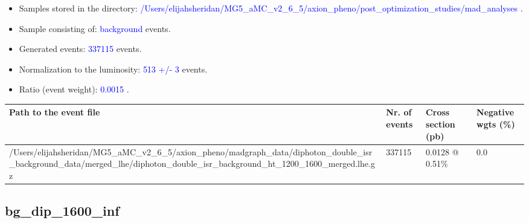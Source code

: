 \documentclass[a4paper, 10pt]{article}
\begin{document}
\begin{itemize}
  \item Samples stored in the directory: \textcolor{blue}{/\-Users/\-elijahsheridan/\-MG5\_aMC\_v2\_6\_5/\-axion\_pheno/\-post\_optimization\_studies/\-mad\_analyses} .
   \item Sample consisting of: \textcolor{blue}{background}  events.
   \item Generated events: \textcolor{blue}{337115 }  events.
   \item Normalization to the luminosity: \textcolor{blue}{513}\textcolor{blue}{ +/\-- }\textcolor{blue}{3 }  events.
   \item Ratio (event weight): \textcolor{blue}{0.0015 } .  
 
\end{itemize}
\begin{table}[H]
  \begin{center}
    \begin{tabular}{|m{55.0mm}|m{25.0mm}|m{30.0mm}|m{30.0mm}|}
      \hline
      {\cellcolor{yellow}         Path to the event file}& {\cellcolor{yellow}         Nr. of events}& {\cellcolor{yellow}         Cross section (pb)}& {\cellcolor{yellow}         Negative wgts (\%)}\\
      \hline
      {\cellcolor{white}          /\-Users/\-elijahsheridan/\-MG5\_aMC\_v2\_6\_5/\-axion\_pheno/\-madgraph\_data/\-diphoton\_double\_isr\_background\_data/\-merged\_lhe/\-diphoton\_double\_isr\_background\_ht\_1200\_1600\_merged.lhe.gz}& {\cellcolor{white}          337115}& {\cellcolor{white}          0.0128 @ 0.51\%}& {\cellcolor{white}          0.0}\\
\hline
    \end{tabular}
  \end{center}
\end{table}

\subsection{ bg\_dip\_1600\_inf}
\end{document}
